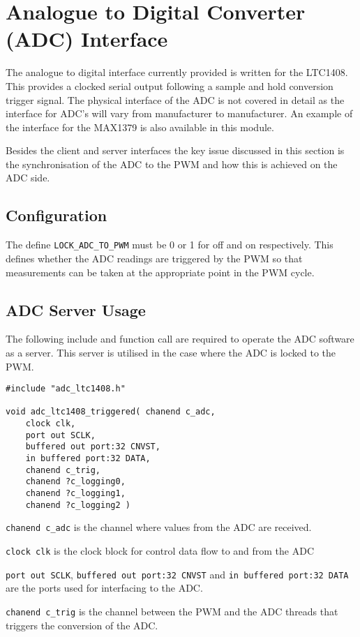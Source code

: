 \section{Analogue to Digital Converter (ADC) Interface}

The analogue to digital interface currently provided is written for the LTC1408. This provides a clocked serial output following a sample and hold conversion trigger signal. The physical interface of the ADC is not covered in detail as the interface for ADC's will vary from manufacturer to manufacturer. An example of the interface for the MAX1379 is also available in this module.

Besides the client and server interfaces the key issue discussed in this section is the synchronisation of the ADC to the PWM and how this is achieved on the ADC side.

\subsection{Configuration}
The define \verb=LOCK_ADC_TO_PWM= must be 0 or 1 for off and on respectively. This defines whether the ADC readings are triggered by the PWM so that measurements can be taken at the appropriate point in the PWM cycle.

\subsection{ADC Server Usage}
The following include and function call are required to operate the ADC software as a server. This server is utilised in the case where the ADC is locked to the PWM.

\begin{lstlisting}
#include "adc_ltc1408.h"

void adc_ltc1408_triggered( chanend c_adc, 
	clock clk, 
	port out SCLK, 
	buffered out port:32 CNVST, 
	in buffered port:32 DATA, 
	chanend c_trig, 
	chanend ?c_logging0, 
	chanend ?c_logging1, 
	chanend ?c_logging2 )
\end{lstlisting}

\verb=chanend c_adc= is the channel where values from the ADC are received.

\verb=clock clk= is the clock block for control data flow to and from the ADC

\verb=port out SCLK=, \verb=buffered out port:32 CNVST= and \verb=in buffered port:32 DATA= are the ports used for interfacing to the ADC.  

\verb=chanend c_trig= is the channel between the PWM and the ADC threads that triggers the conversion of the ADC.

